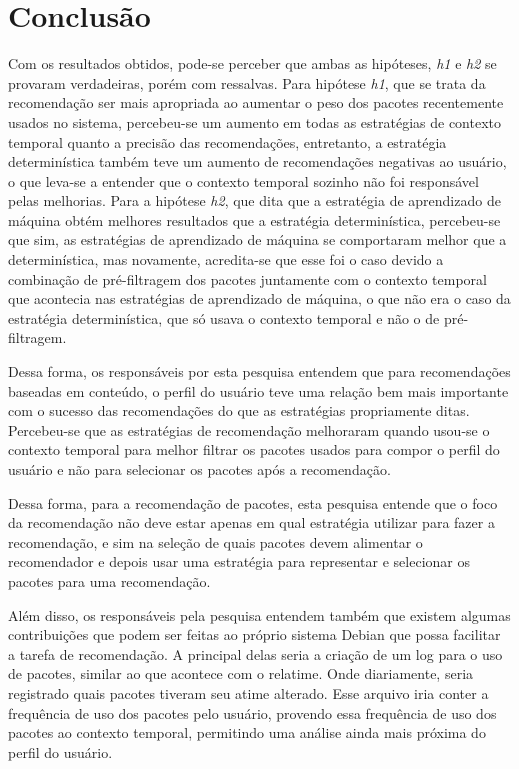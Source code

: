 \chapter[Conclusão]{Conclusão}

Com os resultados obtidos, pode-se perceber que ambas as hipóteses, \textit{h1}
e \textit{h2} se provaram verdadeiras, porém com ressalvas. Para hipótese
\textit{h1}, que se trata da recomendação ser mais apropriada ao aumentar o
peso dos pacotes recentemente usados no sistema, percebeu-se um aumento em todas
as estratégias de contexto temporal quanto a precisão das recomendações,
entretanto, a estratégia determinística também teve um aumento de recomendações
negativas ao usuário, o que leva-se a entender que o contexto temporal sozinho
não foi responsável pelas melhorias. Para a hipótese \textit{h2}, que dita que
a estratégia de aprendizado de máquina obtém melhores resultados que a estratégia
determinística, percebeu-se que sim, as estratégias de aprendizado de máquina se
comportaram melhor que a determinística, mas novamente, acredita-se que esse foi
o caso devido a combinação de pré-filtragem dos pacotes juntamente com o contexto
temporal que acontecia nas estratégias de aprendizado de máquina, o que não era o
caso da estratégia determinística, que só usava o contexto temporal e não o de
pré-filtragem.

Dessa forma, os responsáveis por esta pesquisa entendem que para recomendações
baseadas em conteúdo, o perfil do usuário teve uma relação bem mais importante
com o sucesso das recomendações do que as estratégias propriamente ditas.
Percebeu-se que as estratégias de recomendação melhoraram quando usou-se o
contexto temporal para melhor filtrar os pacotes usados para compor o perfil do
usuário e não para selecionar os pacotes após a recomendação.

Dessa forma, para a recomendação de pacotes, esta pesquisa entende que o foco da
recomendação não deve estar apenas em qual estratégia utilizar para fazer a
recomendação, e sim na seleção de quais pacotes devem alimentar o recomendador e
depois usar uma estratégia para representar e selecionar os pacotes para uma
recomendação.

Além disso, os responsáveis pela pesquisa entendem também que existem algumas
contribuições que podem ser feitas ao próprio sistema Debian que possa facilitar
a tarefa de recomendação. A principal delas seria a criação de um log para o uso de
pacotes, similar ao que acontece com o relatime. Onde diariamente, seria registrado
quais pacotes tiveram seu atime alterado. Esse arquivo iria conter a frequência
de uso dos pacotes pelo usuário, provendo essa frequência de uso dos pacotes ao
contexto temporal, permitindo uma análise ainda mais próxima do perfil do usuário.

